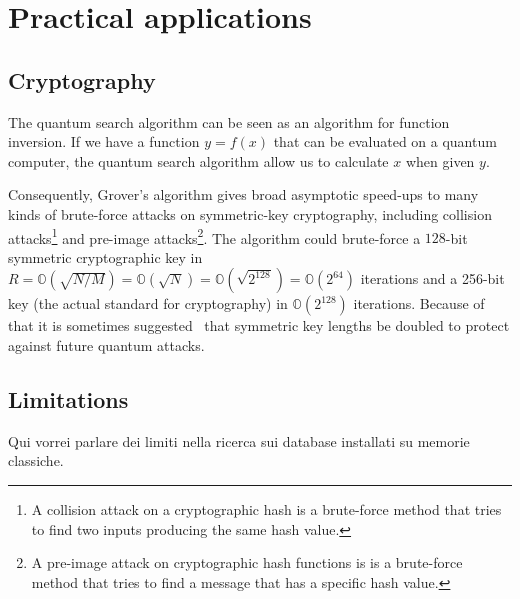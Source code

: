 \section{Practical applications}
\subsection{Cryptography}
The quantum search algorithm can be seen as an algorithm for function inversion. If we have a function $y=f(x)$ that can be evaluated on a quantum computer, the quantum search algorithm allow us to calculate $x$ when given $y$.

Consequently, Grover's algorithm gives broad asymptotic speed-ups to many kinds of brute-force attacks on symmetric-key cryptography, including collision attacks\footnote{A collision attack on a cryptographic hash is a brute-force method that tries to find two inputs producing the same hash value.} and pre-image attacks\footnote{A pre-image attack on cryptographic hash functions is is a brute-force method that tries to find a message that has a specific hash value.}.
The algorithm could brute-force a $128$-bit symmetric cryptographic key in $R = \mathbb{O} (\sqrt{N/M}) = \mathbb{O} (\sqrt{N}) = \mathbb{O} (\sqrt{2^{128}}) = \mathbb{O} (2^{64})$ iterations and a 256-bit key (the actual standard for cryptography) in $\mathbb{O} (2^{128})$ iterations. Because of that  it is sometimes suggested~\cite{10.1007/978-3-642-12929-2_6} that symmetric key lengths be doubled to protect against future quantum attacks.

\subsection{Limitations}
Qui vorrei parlare dei limiti nella ricerca sui database installati su memorie classiche.